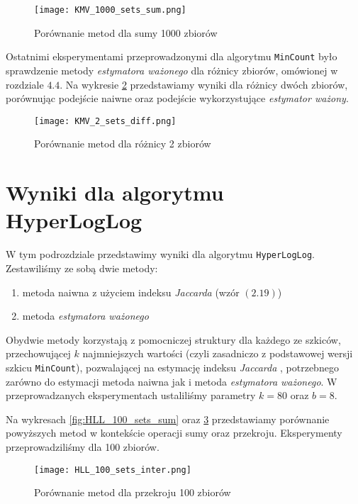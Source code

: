 \begin{figure}[h!]
    \texttt{[image: KMV\_1000\_sets\_sum.png]}
    \centering
    \caption{Porównanie metod dla sumy 1000 zbiorów}
    \label{fig:KMV_1000sets_sum}
\end{figure}

Ostatnimi eksperymentami przeprowadzonymi dla algorytmu \texttt{MinCount} było sprawdzenie metody \textit{estymatora ważonego} dla różnicy zbiorów, omówionej w rozdziale $4.4$. Na wykresie \ref{fig:KMV_2_sets_diff} przedstawiamy wyniki dla różnicy dwóch zbiorów, porównując podejście naiwne oraz podejście wykorzystujące \textit{estymator ważony}.

\begin{figure}[h!]
    \texttt{[image: KMV\_2\_sets\_diff.png]}
    \centering
    \caption{Porównanie metod dla różnicy 2 zbiorów}
    \label{fig:KMV_2_sets_diff}
\end{figure}

\newpage
\section{Wyniki dla algorytmu HyperLogLog}
W tym podrozdziale przedstawimy wyniki dla algorytmu \texttt{HyperLogLog}. Zestawiliśmy ze sobą dwie metody:
\begin{enumerate}
	\item metoda naiwna z użyciem indeksu \textit{Jaccarda} (wzór $(2.19)$)
	\item metoda \textit{estymatora ważonego}
\end{enumerate}
Obydwie metody korzystają z pomocniczej struktury dla każdego ze szkiców, przechowującej $k$ najmniejszych wartości (czyli zasadniczo z podstawowej wersji szkicu \texttt{MinCount}), pozwalającej na estymację indeksu \textit{Jaccarda} \cite{adroll}, potrzebnego zarówno do estymacji metoda naiwna jak i metoda \textit{estymatora ważonego}. W przeprowadzanych eksperymentach ustaliliśmy parametry $k = 80$ oraz $b = 8$.

Na wykresach \ref{fig:HLL_100_sets_sum} oraz \ref{fig:HLL_100_sets_inter} przedstawiamy porównanie powyższych metod w kontekście operacji sumy oraz przekroju. Eksperymenty przeprowadziliśmy dla 100 zbiorów.

\begin{figure}[h!]
    \texttt{[image: HLL\_100\_sets\_inter.png]}
    \centering
    \caption{Porównanie metod dla przekroju 100 zbiorów}
    \label{fig:HLL_100_sets_inter}
\end{figure}

